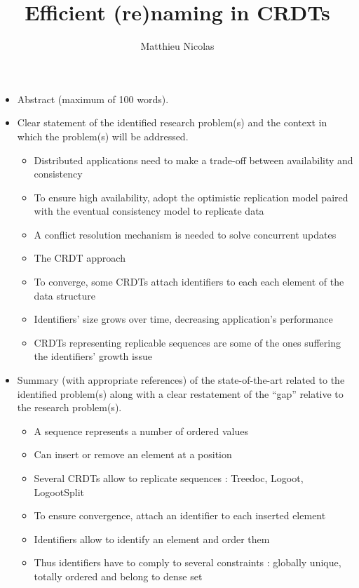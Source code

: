 \documentclass{article}
\title{Efficient (re)naming in \acp{CRDT}}
\author{Matthieu Nicolas \\ \email{matthieu.nicolas@inria.fr}}
\affil{Inria, F-54600,
      Université de Lorraine, LORIA, F-54506,
      CNRS, F-54506}
\date{}
\begin{document}
    \maketitle

    \begin{itemize}
        \item Abstract (maximum of 100 words).
        \item Clear statement of the identified research problem(s) and the context in which the problem(s) will be addressed.
        \begin{itemize}
            \item Distributed applications need to make a trade-off between availability and consistency
            \item To ensure high availability, adopt the optimistic replication model paired with the eventual consistency model to replicate data
            \item A conflict resolution mechanism is needed to solve concurrent updates
            \item The \ac{CRDT} approach
            \item To converge, some \acp{CRDT} attach identifiers to each each element of the data structure
            \item Identifiers' size grows over time, decreasing application's performance
            \item \acp{CRDT} representing replicable sequences are some of the ones suffering the identifiers' growth issue
        \end{itemize}
        \item Summary (with appropriate references) of the state-of-the-art related to the identified problem(s) along with a clear restatement of the “gap” relative to the research problem(s).
        \begin{itemize}
            \item A sequence represents a number of ordered values
            \item Can insert or remove an element at a position
            \item Several \acp{CRDT} allow to replicate sequences : Treedoc, Logoot, LogootSplit
            \item To ensure convergence, attach an identifier to each inserted element
            \item Identifiers allow to identify an element and order them
            \item Thus identifiers have to comply to several constraints : globally unique, totally ordered and belong to dense set

\end{itemize}
\end{itemize}
\end{document}
